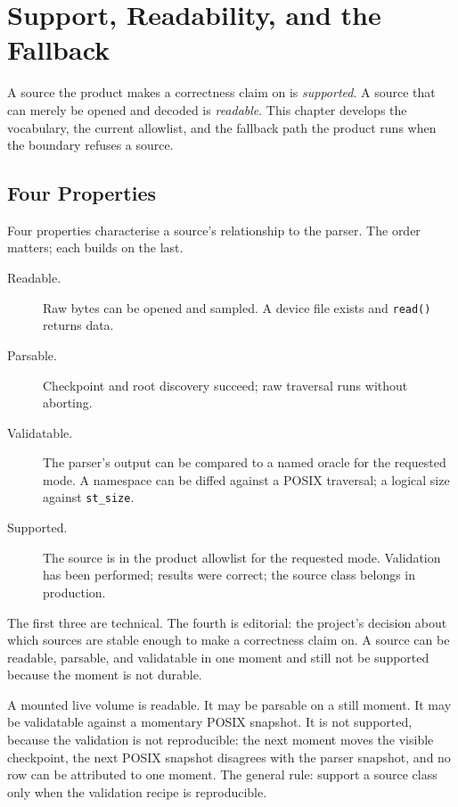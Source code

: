 \chapter{Support, Readability, and the Fallback}

A source the product makes a correctness claim on is
\emph{supported}. A source that can merely be opened and decoded
is \emph{readable}. This chapter develops the vocabulary, the
current allowlist, and the fallback path the product runs when the
boundary refuses a source.

\section{Four Properties}

Four properties characterise a source's relationship to the parser.
The order matters; each builds on the last.

\begin{description}
  \item[Readable.] Raw bytes can be opened and sampled. A device file
    exists and \texttt{read()} returns data.
  \item[Parsable.] Checkpoint and root discovery succeed; raw
    traversal runs without aborting.
  \item[Validatable.] The parser's output can be compared to a named
    oracle for the requested mode. A namespace can be diffed
    against a POSIX traversal; a logical size against
    \texttt{st\_size}.
  \item[Supported.] The source is in the product allowlist for the
    requested mode. Validation has been performed; results were
    correct; the source class belongs in production.
\end{description}

The first three are technical. The fourth is editorial: the
project's decision about which sources are stable enough to make a
correctness claim on. A source can be readable, parsable, and
validatable in one moment and still not be supported because the
moment is not durable.

A mounted live volume is readable. It may be parsable on a still
moment. It may be validatable against a momentary POSIX snapshot.
It is not supported, because the validation is not reproducible:
the next moment moves the visible checkpoint, the next POSIX
snapshot disagrees with the parser snapshot, and no row can be
attributed to one moment. The general rule: support a source class
only when the validation recipe is reproducible.

